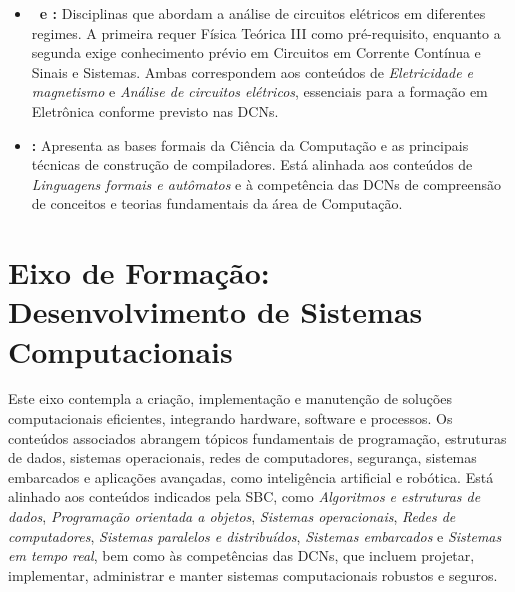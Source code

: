 \begin{itemize}
  \item \textbf{\CCC~e \CCA:} Disciplinas que abordam a análise de circuitos elétricos em diferentes regimes. A primeira requer Física Teórica III como pré-requisito, enquanto a segunda exige conhecimento prévio em Circuitos em Corrente Contínua e Sinais e Sistemas. Ambas correspondem aos conteúdos de \textit{Eletricidade e magnetismo} e \textit{Análise de circuitos elétricos}, essenciais para a formação em Eletrônica conforme previsto nas DCNs.

  \item \textbf{\TeoComp:} Apresenta as bases formais da Ciência da Computação e as principais técnicas de construção de compiladores. Está alinhada aos conteúdos de \textit{Linguagens formais e autômatos} e à competência das DCNs de compreensão de conceitos e teorias fundamentais da área de Computação.
\end{itemize}

\section{Eixo de Formação: Desenvolvimento de Sistemas Computacionais}

Este eixo contempla a criação, implementação e manutenção de soluções computacionais eficientes, integrando hardware, software e processos. Os conteúdos associados abrangem tópicos fundamentais de programação, estruturas de dados, sistemas operacionais, redes de computadores, segurança, sistemas embarcados e aplicações avançadas, como inteligência artificial e robótica. Está alinhado aos conteúdos indicados pela SBC, como \textit{Algoritmos e estruturas de dados}, \textit{Programação orientada a objetos}, \textit{Sistemas operacionais}, \textit{Redes de computadores}, \textit{Sistemas paralelos e distribuídos}, \textit{Sistemas embarcados} e \textit{Sistemas em tempo real}, bem como às competências das DCNs, que incluem projetar, implementar, administrar e manter sistemas computacionais robustos e seguros.




